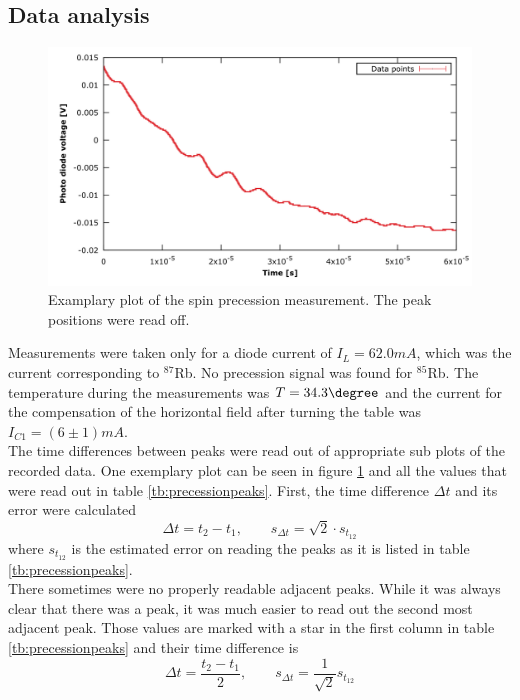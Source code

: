 \subsection{Data analysis}
\begin{figure}
	\centering
	\includegraphics[width=1.0\linewidth]{graphics/spinprecessionexample}
	\caption[Example spin precession]{Examplary plot of the spin precession measurement. The peak positions were read off.}
	\label{fig:spinprecessionexample}
\end{figure}
Measurements were taken only for a diode current of $I_L=\unit{62.0}{mA}$, which was the current corresponding to $^{87}$Rb. No precession signal was found for $^{85}$Rb. The temperature during the measurements was $T=\unit{34.3}{\degree}$ and the current for the compensation of the horizontal field after turning the table was $I_{C1}=\unit{(6\pm1)}{mA}$.\\
The time differences between peaks were read out of appropriate sub plots of the recorded data. One exemplary plot can be seen in figure \ref{fig:spinprecessionexample} and all the values that were read out in table \ref{tb:precessionpeaks}. First, the time difference $\Delta t$ and its error were calculated
\begin{equation}
\Delta t=t_2-t_1, \qquad s_{\Delta t}=\sqrt{2}\cdot s_{t_{12}}
\end{equation}
where $s_{t_{12}}$ is the estimated error on reading the peaks as it is listed in table \ref{tb:precessionpeaks}.\\
There sometimes were no properly readable adjacent peaks. While it was always clear that there was a peak, it was much easier to read out the second most adjacent peak. Those values are marked with a star in the first column in table \ref{tb:precessionpeaks} and their time difference is
\begin{equation}
\Delta t=\frac{t_2-t_1}{2},\qquad s_{\Delta t}=\frac{1}{\sqrt{2}}s_{t_{12}}
\end{equation}
